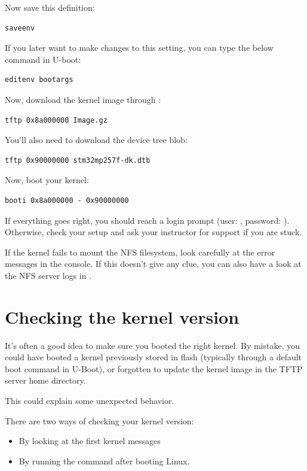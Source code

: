 Now save this definition:
\begin{verbatim}
saveenv
\end{verbatim}

If you later want to make changes to this setting, you can type the
below command in U-boot:

\begin{verbatim}
editenv bootargs
\end{verbatim}

Now, download the kernel image through :

\begin{verbatim}
tftp 0x8a000000 Image.gz
\end{verbatim}

You'll also need to download the device tree blob:

\begin{verbatim}
tftp 0x90000000 stm32mp257f-dk.dtb
\end{verbatim}

Now, boot your kernel:

\begin{verbatim}
booti 0x8a000000 - 0x90000000
\end{verbatim}

If everything goes right, you should reach a login prompt (user:
, password: ). Otherwise, check your setup and
ask your instructor for support if you are stuck.

If the kernel fails to mount the NFS filesystem, look carefully at the
error messages in the console. If this doesn't give any clue, you can
also have a look at the NFS server logs in .

\section{Checking the kernel version}

It's often a good idea to make sure you booted the right kernel.
By mistake, you could have booted a kernel previously stored in flash
(typically through a default boot command in U-Boot), or forgotten to
update the kernel image in the TFTP server home directory.

This could explain some unexpected behavior.

There are two ways of checking your kernel version:
\begin{itemize}
\item By looking at the first kernel messages
\item By running the  command after booting Linux.
\end{itemize}

